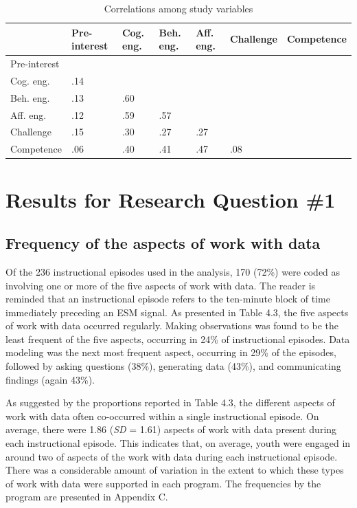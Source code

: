 \documentclass[]{msu-thesis}
\theoremstyle{definition}
\theoremstyle{definition}
\theoremstyle{definition}
\theoremstyle{remark}
\begin{document}
\begin{table}

\caption{\label{tab:unnamed-chunk-8}Correlations among study variables}
\centering
\begin{tabular}[t]{lllllll}
\toprule
 & Pre-interest & Cog. eng. & Beh. eng. & Aff. eng. & Challenge & Competence\\
\midrule
Pre-interest &  &  &  &  &  & \\
Cog. eng. & .14 &  &  &  &  & \\
Beh. eng. & .13 & .60 &  &  &  & \\
Aff. eng. & .12 & .59 & .57 &  &  & \\
Challenge & .15 & .30 & .27 & .27 &  & \\
Competence & .06 & .40 & .41 & .47 & .08 & \\
\bottomrule
\end{tabular}
\end{table}

\section{Results for Research Question
\#1}\label{results-for-research-question-1}

\subsection{Frequency of the aspects of work with
data}\label{frequency-of-the-aspects-of-work-with-data}

Of the 236 instructional episodes used in the analysis, 170 (72\%) were
coded as involving one or more of the five aspects of work with data.
The reader is reminded that an instructional episode refers to the
ten-minute block of time immediately preceding an ESM signal. As
presented in Table 4.3, the five aspects of work with data occurred
regularly. Making observations was found to be the least frequent of the
five aspects, occurring in 24\% of instructional episodes. Data modeling
was the next most frequent aspect, occurring in 29\% of the episodes,
followed by asking questions (38\%), generating data (43\%), and
communicating findings (again 43\%).

As suggested by the proportions reported in Table 4.3, the different
aspects of work with data often co-occurred within a single
instructional episode. On average, there were 1.86 (\emph{SD} = 1.61)
aspects of work with data present during each instructional episode.
This indicates that, on average, youth were engaged in around two of
aspects of the work with data during each instructional episode. There
was a considerable amount of variation in the extent to which these
types of work with data were supported in each program. The frequencies
by the program are presented in Appendix C.
\end{document}
